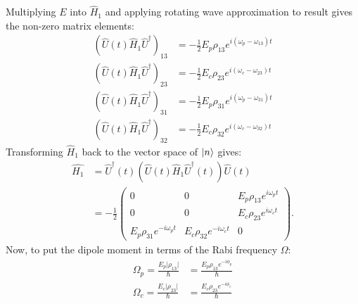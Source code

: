 \documentclass{article}
\theoremstyle{definition}
\begin{document}
Multiplying $E$ into $\hat{H}_1$ and applying rotating wave approximation to result gives the non-zero matrix elements:
\begin{align}
\left( \hat{U}(t)\hat{H}_1\hat{U}^\dagger\right)_{13} &= 
-\frac{1}{2}E_p \rho_{13}e^{i(\omega_p - \omega_{13})t}\\
\left( \hat{U}(t)\hat{H}_1\hat{U}^\dagger\right)_{23} &= 
-\frac{1}{2}E_c \rho_{23}e^{i(\omega_c - \omega_{23})t}\\
\left( \hat{U}(t)\hat{H}_1\hat{U}^\dagger\right)_{31} &= 
-\frac{1}{2}E_p \rho_{31}e^{i(\omega_p - \omega_{31})t}\\
\left( \hat{U}(t)\hat{H}_1\hat{U}^\dagger\right)_{32} &= 
-\frac{1}{2}E_c \rho_{32}e^{i(\omega_c - \omega_{32})t}
\end{align}
Transforming $\hat{H}_1$ back to the vector space of $\ket{n}$ gives:
\begin{align}
\hat{H_1} &= \hat{U}^\dagger(t) \left( \hat{U}(t) \hat{H}_1 \hat{U}^\dagger(t)\right) \hat{U}(t) \nonumber \\
&= 
-\frac{1}{2}\begin{pmatrix}
0 & 0 & E_p\rho_{13}e^{i\omega_pt}\\
0 & 0 & E_c\rho_{23}e^{i\omega_ct}\\
E_p\rho_{31}e^{-i\omega_pt} & E_c\rho_{32}e^{-i\omega_ct} & 0
\end{pmatrix}.
\end{align}
Now, to put the dipole moment in terms of the Rabi frequency $\Omega$:
\begin{align}
\Omega_p = \frac{E_p\vert \rho_{13} \vert}{\hbar} &= \frac{E_p\rho_{13}e^{-i\phi_p}}{\hbar}\\
\Omega_c = \frac{E_c\vert \rho_{23} \vert}{\hbar} &= \frac{E_c\rho_{23}e^{-i\phi_c}}{\hbar}
\end{align}

















	
\end{document}
